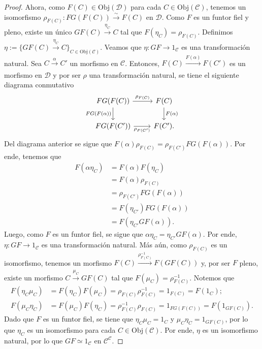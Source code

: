 \documentclass[tesis]{subfiles}
\begin{document}
\begin{proof}
    Ahora, como $F(C) \in \text{Obj}(\mathscr{D})$ para cada $C \in \text{Obj}(\mathscr{C})$, tenemos un isomorfismo $\rho_{F(C)}: FG(F(C))\xrightarrow[]{\sim} F(C)$ en $\mathscr{D}$. Como $F$ es un funtor fiel y pleno, existe un único $GF(C)\xrightarrow[]{\eta_C} C$ tal que $F(\eta_C)=\rho_{F(C)}.$ Definimos $\eta:= \{GF(C)\xrightarrow[]{\eta_C} C \}_{C \in \text{Obj}(\mathscr{C})}$. Veamos que $\eta : GF \to 1_{\mathscr{C}}$ es una transformación natural. Sea $C\xrightarrow[]{\alpha} C'$ un morfismo en $\mathscr{C}$. Entonces, $F(C)\xrightarrow[]{F(\alpha)} F(C')$ es un morfismo en $\mathscr{D}$ y por ser $\rho$ una transformación natural, se tiene el siguiente diagrama conmutativo
    \[\begin{tikzcd}
    FG(F(C)) \arrow{r}{\rho_{F(C)}} \arrow{d}[swap]{FG(F(\alpha))} & F(C) \arrow{d} {F(\alpha)} \\
    FG(F(C')) \arrow{r}[swap]{\rho_{F(C')}}                     & F(C'). 
    \end{tikzcd}\]
    Del diagrama anterior se sigue que $F(\alpha)\rho_{F(C)} = \rho_{F(C')} FG(F(\alpha))$. Por ende, tenemos que
\begin{align*}
    F( \alpha  \eta_C ) &= F(\alpha) F(\eta_C) \\
    &= F(\alpha) \rho_{F(C)} \\
    &=\rho_{F(C')} FG(F(\alpha)) \\
    &= F(\eta_{C'}) FG(F(\alpha))\\
    &= F(\eta_{C'} GF(\alpha)).
\end{align*}
    Luego, como $F$ es un funtor fiel, se sigue que $\alpha \eta_C = \eta_{C'} GF(\alpha).$ Por ende,  $\eta: GF\to 1_{\mathscr{C}}$ es una transformación natural. Más aún, como $\rho_{F(C)}$ es un isomorfismo, tenemos un morfismo $F(C)\xrightarrow[]{\rho_{F(C)}^{-1}} F(GF(C))$ y, por ser $F$ pleno, existe un morfismo $C\xrightarrow[]{\mu_{C}} GF(C)$ tal que $F(\mu_C)=\rho_{F(C)}^{-1}$. Notemos que 
\begin{align*}
    F(\eta_C  \mu_C) &= F(\eta_C) F(\mu_C) = \rho_{F(C)} \rho_{F(C)}^{-1} = 1_{F(C)} = F(1_C); \\
    F(\mu_C \eta_C) &= F(\mu_C) F(\eta_C) = \rho_{F(C)}^{-1} \rho_{F(C)} = 1_{FG(F(C))} = F(1_{GF(C)}). 
\end{align*}
Dado que $F$ es un funtor fiel, se tiene que $\eta_C \mu_C = 1_C$ y $\mu_C \eta_C = 1_{GF(C)}$, por lo que $\eta_C$ es un isomorfismo  para cada $C \in \text{Obj}(\mathscr{C})$. Por ende, $\eta$ es un isomorfismo natural, por lo que $GF \simeq 1_{\mathscr{C}}$ en $\mathscr{C}^\mathscr{C}$.
\end{proof}
\end{document}

